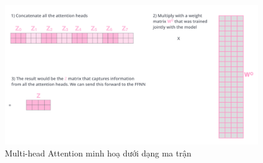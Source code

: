 \begin{enumerate}[label=\textbf{\arabic*}]
    \begin{figure}[htb]
        \centering
        \includegraphics[width=\textwidth]{image/multi-head-illustration.png}
        \caption{Multi-head Attention minh hoạ dưới dạng ma trận}
        \label{figure:multi-head-illustration}
    \end{figure}

\end{enumerate}
